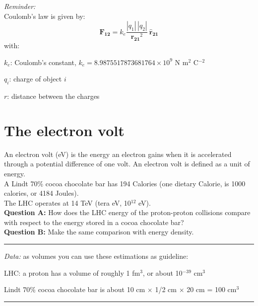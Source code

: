 \documentclass[12pt]{article}
\begin{document}
\textit{Reminder:}\\


Coulomb's law is given by:
\begin{equation}
 \mathbf{F_{12}} = k_e \frac{|q_1| \, |q_2|}{\mathbf{r_{21}}^2} \: \mathbf{\hat{r}_{21}} 
\end{equation}
with:
    \begin{description}
        \item $k_e$: Coulomb's constant, $k_e = 8.9875517873681764 \times 10^9$ N m$^2$ C$^{-2}$
        \item $q_i$: charge of object $i$
        \item $r$: distance between the charges
    \end{description}

\section{The electron volt}
An electron volt (eV) is the energy an electron gains when it is accelerated through a potential difference of one volt. An electron volt is defined as a unit of energy.\\

A Lindt 70\% cocoa chocolate bar has 194 Calories (one dietary Calorie, is 1000 calories, or 4184 Joules).\\

The LHC operates at 14 TeV (tera eV, 10$^{12}$ eV).\\


\textbf{Question A:} How does the LHC energy of the proton-proton collisions compare with respect to the energy stored in a cocoa chocolate bar?\\ 

\textbf{Question B:} Make the same comparison with energy density.\\

\vspace{4ex}
\hrule
\vspace{4ex}
\textit{Data:} as volumes you can use these estimations as guideline:
    \begin{description}
        \item LHC: a proton has a volume of roughly 1 fm$^3$, or about 10$^{-39}$ cm$^3$
        \item Lindt 70\% cocoa chocolate bar is about 10 cm $\times$ 1/2 cm $\times$ 20 cm = 100 cm$^3$
    \end{description}

\vspace{4ex}
\hrule
\vspace{4ex}
    
\end{document}
